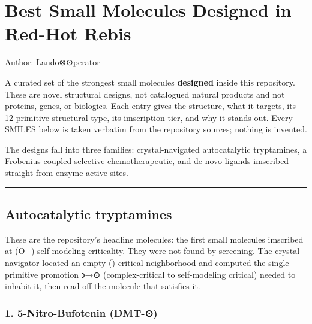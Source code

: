 \hypertarget{best-small-molecules-designed-in-red-hot-rebis}{%
\section{Best Small Molecules Designed in Red-Hot
Rebis}\label{best-small-molecules-designed-in-red-hot-rebis}}

Author: Lando⊗⊙perator

A curated set of the strongest small molecules \textbf{designed} inside
this repository. These are novel structural designs, not catalogued
natural products and not proteins, genes, or biologics. Each entry gives
the structure, what it targets, its 12-primitive structural type, its
imscription tier, and why it stands out. Every SMILES below is taken
verbatim from the repository sources; nothing is invented.

The designs fall into three families: crystal-navigated autocatalytic
tryptamines, a Frobenius-coupled selective chemotherapeutic, and de-novo
ligands imscribed straight from enzyme active sites.

\begin{center}\rule{0.5\linewidth}{0.5pt}\end{center}

\hypertarget{autocatalytic-tryptamines}{%
\subsection{Autocatalytic tryptamines}\label{autocatalytic-tryptamines}}

These are the repository's headline molecules: the first small molecules
imscribed at (O\_\infty) self-modeling criticality. They were not found
by screening. The crystal navigator located an empty (\odot)-critical
neighborhood and computed the single-primitive promotion 𐑮→⊙
(complex-critical to self-modeling critical) needed to inhabit it, then
read off the molecule that satisfies it.

\hypertarget{nitro-bufotenin-dmt-}{%
\subsubsection{1. 5-Nitro-Bufotenin
(DMT-⊙)}\label{nitro-bufotenin-dmt-}}

